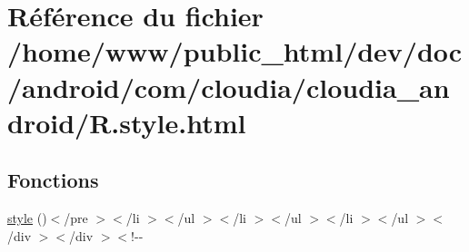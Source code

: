 \hypertarget{_r_8style_8html}{\section{Référence du fichier /home/www/public\-\_\-html/dev/doc/android/com/cloudia/cloudia\-\_\-android/\-R.style.\-html}
\label{_r_8style_8html}
}
\subsection*{Fonctions}
\begin{DoxyCompactItemize}
\item 
\hyperlink{_r_8style_8html_aa1dbaabd8ac686fa321af9632b001395}{style} ()$<$/pre $>$$<$/li $>$$<$/ul $>$$<$/li $>$$<$/ul $>$$<$/li $>$$<$/ul $>$$<$/div $>$$<$/div $>$$<$!-\/-\/
\end{DoxyCompactItemize}
